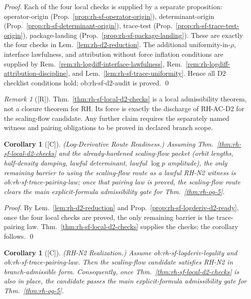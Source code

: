 \documentclass[12pt,oneside]{amsbook}
\theoremstyle{plain}
\newtheorem{corollary}[theorem]{Corollary}
\theoremstyle{definition}
\theoremstyle{remark}
\newtheorem{remark}[theorem]{Remark}
\newcommand{\status}[1]{\textup{[#1]}}
\begin{document}
\begin{proof}
Each of the four local checks is supplied by a separate proposition:
operator-origin (Prop.~\ref{prop:rh-sf-operator-origin}), determinant-origin
(Prop.~\ref{prop:rh-sf-determinant-origin}), trace-test
(Prop.~\ref{prop:rh-sf-trace-test-origin}), package-landing
(Prop.~\ref{prop:rh-sf-package-landing}). These are exactly the
four checks in Lem.~\ref{lem:rh-d2-reduction}. The additional
uniformity-in-$\rho$, interface lawfulness, and attribution without
force inflation conditions are supplied by
Rem.~\ref{rem:rh-logdiff-interface-lawfulness},
Rem.~\ref{rem:rh-logdiff-attribution-discipline}, and
Lem.~\ref{lem:rh-sf-trace-uniformity}. Hence all D2 checklist
conditions hold; ob:rh-sf-d2-audit is proved. \qed
\end{proof}

\begin{remark}[\status{R}]\label{rem:rh-sf-d2-scope}
Thm.~\ref{thm:rh-sf-local-d2-checks} is a local admissibility
theorem, not a closure theorem for RH. Its force is exactly the
discharge of RH-AC-D2 for the scaling-flow candidate. Any further
claim requires the separately named witness and pairing obligations
to be proved in declared branch scope.
\end{remark}

\begin{corollary}[\status{C}]\label{cor:rh-sf-logroute-ready}
\textup{(Log-Derivative Route Readiness.)}
Assuming Thm.~\ref{thm:rh-sf-local-d2-checks} and the already-hardened
scaling-flow packet (orbit lengths, half-density damping, lawful
determinant, lawful $\log p$ amplitude), the only remaining barrier
to using the scaling-flow route as a lawful RH-N2 witness is
ob:rh-sf-trace-pairing-law; once that pairing law is proved,
the scaling-flow route clears the main explicit-formula admissibility
gate for Thm.~\ref{thm:rh-og-5}.
\end{corollary}

\begin{proof}
By Lem.~\ref{lem:rh-d2-reduction} and
Prop.~\ref{prop:rh-sf-logderiv-d2-ready}, once the four local checks
are proved, the only remaining barrier is the trace-pairing law.
Thm.~\ref{thm:rh-sf-local-d2-checks} supplies the checks; the corollary
follows. \qed
\end{proof}

\begin{corollary}[\status{C}]\label{cor:rh-sf-rhN2-realized}
\textup{(RH-N2 Realization.)}
Assume ob:rh-sf-logderiv-legality and ob:rh-sf-trace-pairing-law.
Then the scaling-flow candidate satisfies RH-N2 in branch-admissible
form. Consequently, once Thm.~\ref{thm:rh-sf-local-d2-checks} is
also in place, the candidate passes the main explicit-formula
admissibility gate for Thm.~\ref{thm:rh-og-5}.
\end{corollary}
\end{document}
